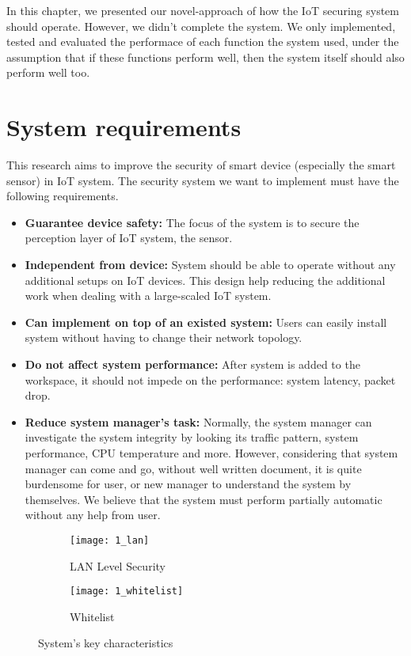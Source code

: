 In this chapter, we presented our novel-approach of how the IoT securing system should operate. However, we didn't complete the system. We only implemented, tested and evaluated the performace of each function the system used, under the assumption that if these functions perform well, then the system itself should also perform well too.

\section{System requirements}
This research aims to improve the security of smart device (especially the smart sensor) in IoT system. 
The security system we want to implement must have the following requirements. 

\begin{itemize}
    \item \textbf{Guarantee device safety:} The focus of the system is to secure the perception layer of IoT system, the sensor.  
    \item \textbf{Independent from device:} System should be able to operate without any additional setups on IoT devices. This design help reducing the additional work when dealing with a large-scaled IoT system.    
    \item \textbf{Can implement on top of an existed system:} Users can easily install system without having to change their network topology.
    \item \textbf{Do not affect system performance:} After system is added to the workspace, it should not impede on the performance: system latency, packet drop.
    \item \textbf{Reduce system manager’s task:} Normally, the system manager can investigate the system integrity by looking its traffic pattern, system performance, CPU temperature and more. However, considering that system manager can come and go, without well written document, it is quite burdensome for user, or new manager to understand the system by themselves. We believe that the system must perform partially automatic without any help from user.
\end{itemize}

\begin{figure}
    \centering
    \begin{subfigure}[b]{0.4\textwidth}
        \centering
        \texttt{[image: 1\_lan]}
        \caption{LAN Level Security}
        \label{fig:s3_lan} 
    \end{subfigure}
    \hspace{1.5cm}
    \begin{subfigure}[b]{0.4\textwidth}
        \centering
        \texttt{[image: 1\_whitelist]}
        \caption{Whitelist}
        \label{fig:s3_whitelist}
    \end{subfigure} 
    \caption{System's key characteristics}
    \label{fig:s3_system_characteristics}
\end{figure}


